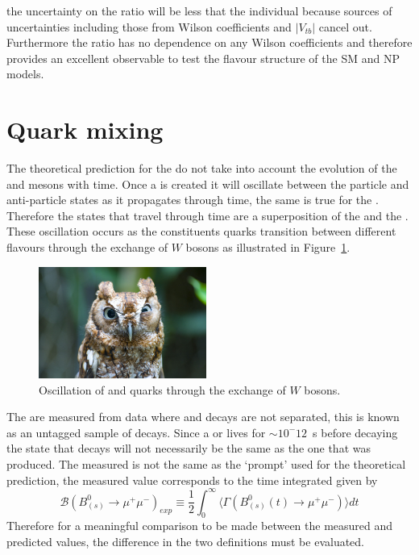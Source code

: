 {the uncertainty on the ratio will be less that the individual \BFs because sources of uncertainties including those from Wilson coefficients and $|V_{tb}|$ cancel out. Furthermore the ratio has no dependence on any Wilson coefficients and therefore provides an excellent observable to test the flavour structure of the SM and NP models.


\section{Quark mixing}
\label{sec:quarkmaixing}
The theoretical prediction for the \bmumu \BFs do not take into account the evolution of the \bsd and \barbsd mesons with time. Once a \bsd is created it will oscillate between the particle and anti-particle states as it propagates through time, the same is true for the \barbsd. Therefore the states that travel through time are a superposition of the \bsd and the \barbsd. These oscillation occurs as the constituents quarks transition between different flavours through the exchange of $W$ bosons as illustrated in Figure~\ref{fig:Oscl_diag}.
\begin{figure}[htbp]
    \centering
        \includegraphics[width=0.49\textwidth]{./Figs/placeholder.jpeg}
    \caption{Oscillation of \bsd and \barbsd quarks through the exchange of $W$ bosons.}
    \label{fig:Oscl_diag}
\end{figure}
The \BFs are measured from data where \bsd and \barbsd decays are not separated, this is known as an untagged sample of \bmumu decays. Since a \bsd or \barbsd lives for $\sim 10^-12$~s before decaying the state that decays will not necessarily be the same as the one that was produced. The measured \BF is not the same as the `prompt' \BF used for the theoretical prediction, the measured value corresponds to the time integrated \BF given by
\begin{equation}
  \mathcal{B}(B^0_{(s)} \to \mu^+ \mu^-)_{exp} \equiv \frac{1}{2} \int^{\infty}_0 \langle \Gamma(B^0_{(s)}(t) \to \mu^+\mu^-) \rangle dt
\label{eq:time_BF}
\end{equation}
Therefore for a meaningful comparison to be made between the measured and predicted \BF values, the difference in the two definitions must be evaluated.

}
